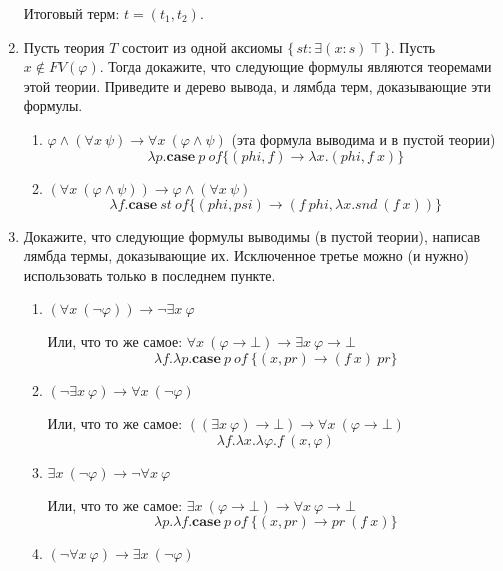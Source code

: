 \begin{enumerate}
Итоговый терм: $t = (t_1, t_2)$.

\item Пусть теория $T$ состоит из одной аксиомы $\{\,st : \exists (x : s)\ \top\,\}$.
    Пусть $x \notin FV(\varphi)$.
    Тогда докажите, что следующие формулы являются теоремами этой теории.
    Приведите и дерево вывода, и лямбда терм, доказывающие эти формулы.
\begin{enumerate}
\item $\varphi \land (\forall x\ \psi) \to \forall x\ (\varphi \land \psi)$ (эта формула выводима и в пустой 
теории)
\begin{equation*}
	\lambda p. \mathbf{case} \ p \ of \{ (phi, f) \to \lambda x.(phi, f \ x) \}
\end{equation*}
\item $(\forall x\ (\varphi \land \psi)) \to \varphi \land (\forall x\ \psi)$
\begin{equation*}
	\lambda f. \mathbf{case} \ st \ of \{ (phi, psi) \to (f\ phi, \lambda x. snd \ (f \ x)) \}
\end{equation*}
\end{enumerate}

\item Докажите, что следующие формулы выводимы (в пустой теории), написав лямбда термы, доказывающие их.
    Исключенное третье можно (и нужно) использовать только в последнем пункте.
\begin{enumerate}
\item $(\forall x\ (\neg \varphi)) \to \neg \exists x\ \varphi$

Или, что то же самое: $\forall x\ (\varphi \to \bot) \to \exists x\ \varphi \to \bot$
\begin{equation*}
	\lambda f.\lambda p. \mathbf{case} \ p \ of \ \{(x, pr) \to (f \ x) \ pr\}
\end{equation*}
\item $(\neg \exists x\ \varphi) \to \forall x\ (\neg \varphi)$

Или, что то же самое:  $((\exists x\ \varphi) \to \bot) \to \forall x\ (\varphi \to \bot)$
\begin{equation*}
	\lambda f.\lambda x. \lambda \varphi .f \ (x, \varphi) 
\end{equation*}
\item $\exists x\ (\neg \varphi) \to \neg \forall x\ \varphi$

Или, что то же самое:  $\exists x\ (\varphi \to \bot) \to \forall x\ \varphi \to \bot$
\begin{equation*}
	\lambda p. \lambda f. \mathbf{case} \ p \ of \ \{(x, pr) \to pr \ (f \ x)\}
\end{equation*}
\item $(\neg \forall x\ \varphi) \to \exists x\ (\neg \varphi)$


\end{enumerate}
\end{enumerate}
